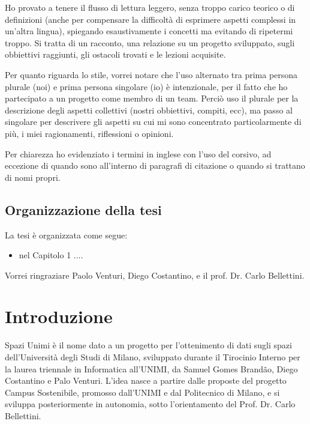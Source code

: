 \documentclass[12pt]{report}
\begin{document}
Ho provato a tenere il flusso di lettura leggero, senza troppo carico
teorico o di definizioni (anche per compensare la difficoltà di esprimere
aspetti complessi in un'altra lingua), spiegando esaustivamente i 
concetti ma evitando di ripetermi troppo. Si tratta di un racconto, 
una relazione su un progetto sviluppato, sugli obbiettivi raggiunti, 
gli ostacoli trovati e le lezioni acquisite.

Per quanto riguarda lo stile, vorrei notare che l'uso alternato tra prima
persona plurale (noi) e prima persona singolare (io) è intenzionale, per
il fatto che ho partecipato a un progetto come membro di un team. Perciò
uso il plurale per la descrizione degli aspetti collettivi 
(nostri obbiettivi, compiti, ecc), ma passo al singolare per descrivere gli
aspetti su cui mi sono concentrato particolarmente di più, i miei
ragionamenti, riflessioni o opinioni.

Per chiarezza ho evidenziato i termini in inglese con l'uso del corsivo, 
ad eccezione di quando sono all'interno di paragrafi di citazione o quando
si trattano di nomi propri.

%
%
\section*{Organizzazione della tesi}
\label{organizzazione}
La tesi \`e organizzata come segue:
\begin{itemize}
\item nel Capitolo 1 ....
\end{itemize}
%
%
Vorrei ringraziare Paolo Venturi, Diego Costantino, 
e il prof. Dr. Carlo Bellettini. 
\afterpreface


% 
% 
\chapter{Introduzione}
\label{cap1}

Spazi Unimi è il nome dato a un progetto per l'ottenimento di dati sugli 
spazi dell’Università degli Studi di Milano, sviluppato durante il 
Tirocinio Interno per la laurea triennale in Informatica all’UNIMI, 
da Samuel Gomes Brandão, Diego Costantino e Palo Venturi. L'idea 
nasce a partire dalle proposte del progetto Campus Sostenibile, 
promosso dall’UNIMI e dal Politecnico di Milano, e si sviluppa 
posteriormente in autonomia, sotto l'orientamento del Prof. Dr. Carlo Bellettini.
\end{document}
